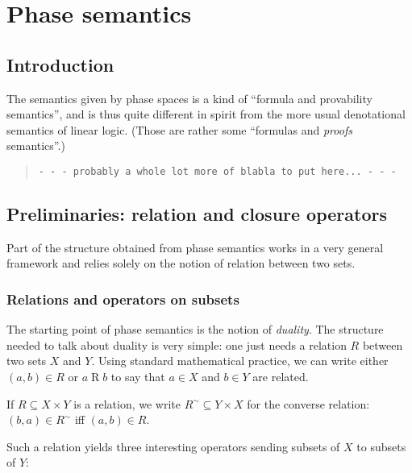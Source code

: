 \chapter{Phase semantics}\label{phase-semantics}

\section{Introduction}\label{introduction}

The semantics given by phase spaces is a kind of ``formula and
provability semantics'', and is thus quite different in spirit from the
more usual denotational semantics of linear logic. (Those are rather
some ``formulas and \emph{proofs} semantics''.)

\begin{quotation}
\texttt{- - - probably a whole lot more of blabla to put here... - - -}
\end{quotation}

\section{Preliminaries: relation and closure operators}\label{preliminaries-relation-and-closure-operators}

Part of the structure obtained from phase semantics works in a very
general framework and relies solely on the notion of relation between
two sets.

\subsection{Relations and operators on subsets}\label{relations-and-operators-on-subsets}

The starting point of phase semantics is the notion of \emph{duality}.
The structure needed to talk about duality is very simple: one just
needs a relation \(R\) between two sets \(X\) and \(Y\). Using standard
mathematical practice, we can write either \((a,b) \in R\) or
\(a\mathrel{R} b\) to say that \(a\in X\) and \(b\in Y\) are related.

\begin{definition}
If $R\subseteq X\times Y$ is a relation, we write $R^\sim\subseteq Y\times X$ for the converse relation: $(b,a)\in R^\sim$ iff $(a,b)\in R$.
\end{definition}

Such a relation yields three interesting operators sending subsets of
\(X\) to subsets of \(Y\):

